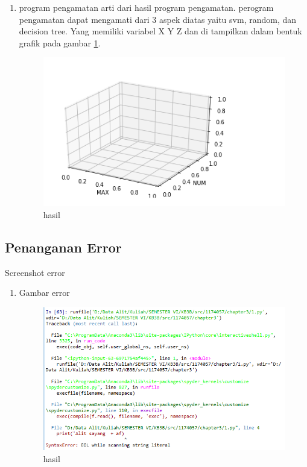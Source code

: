 \begin{enumerate}
\item program pengamatan
arti dari hasil program pengamatan. perogram pengamatan dapat mengamati dari 3 aspek diatas yaitu svm, random, dan decision tree. Yang memiliki variabel X Y Z dan di tampilkan dalam bentuk grafik pada gambar \ref{contoh8}. 

\begin{figure}[ht]
\centering
\includegraphics[scale=1]{figures/1174057/chapter3/12.PNG}
\caption{hasil}
\label{contoh8}
\end{figure}
\end{enumerate}


\subsection{Penanganan Error}
Screenshot error
\begin{enumerate}
\item  Gambar error
\begin{figure}[ht]
\centering
\includegraphics[scale=1]{figures/1174057/chapter3/error.PNG}
\caption{hasil}
\label{error}
\end{figure}
\end{enumerate}

